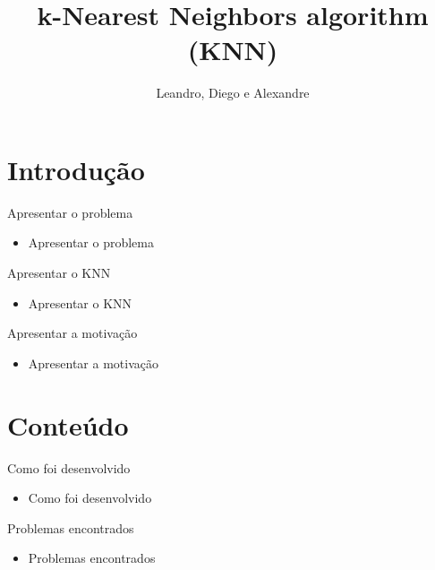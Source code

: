 \documentclass[11pt]{beamer}
\author{Leandro, Diego e Alexandre}
\title{k-Nearest Neighbors algorithm (KNN)}
\begin{document}
\begin{frame}
\titlepage
\end{frame}

\begin{frame}
\tableofcontents
\end{frame}

\section{Introdução}
\begin{frame}{Apresentar o problema}

\begin{itemize}
	\item Apresentar o problema
\end{itemize}

\end{frame}

\begin{frame}{Apresentar o KNN}

\begin{itemize}
	\item Apresentar o KNN
\end{itemize}

\end{frame}


\begin{frame}{Apresentar a motivação}

\begin{itemize}
	\item Apresentar a motivação
\end{itemize}

\end{frame}

\section{Conteúdo}
\begin{frame}{Como foi desenvolvido}

\begin{itemize}
	\item Como foi desenvolvido
\end{itemize}

\end{frame}

\begin{frame}{Problemas encontrados}

\begin{itemize}
	\item Problemas encontrados
\end{itemize}

\end{frame}
\end{document}
